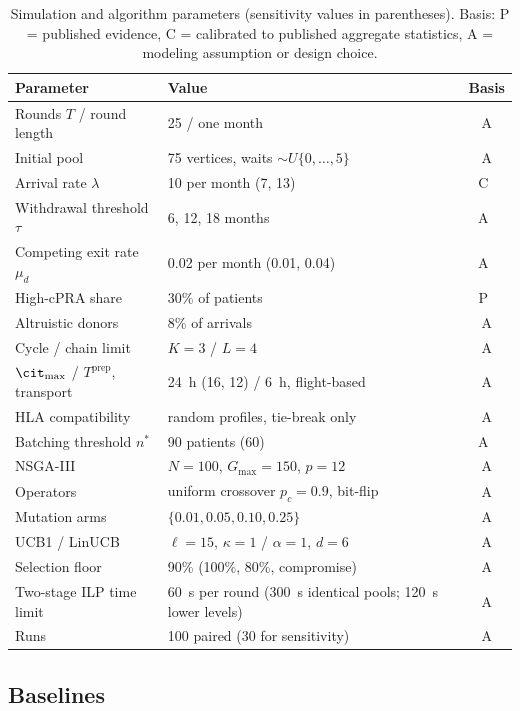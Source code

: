 \documentclass[journal]{IEEEtran}
\begin{document}
\begin{table}[!htbp]
\caption{Simulation and algorithm parameters (sensitivity values in
parentheses). Basis: P = published evidence, C = calibrated to
published aggregate statistics, A = modeling assumption or design
choice.}
\label{tab:params}
\begin{tabular}{llc}
\toprule
Parameter & Value & Basis \\
\midrule
Rounds $T$ / round length & 25 / one month & A \\
Initial pool & 75 vertices, waits $\sim U\{0,\dots,5\}$ & A \\
Arrival rate $\lambda$ & 10 per month (7, 13) & C~\cite{ANZKX2021,DonateLife2024} \\
Withdrawal threshold $\tau$ & 6, 12, 18 months & A~\cite{Ferrari2012} \\
Competing exit rate $\mu_d$ & 0.02 per month (0.01, 0.04) & A~\cite{DonateLife2024} \\
High-cPRA share & 30\% of patients & P~\cite{ANZDATA2026} \\
Altruistic donors & 8\% of arrivals & A \\
Cycle / chain limit & $K = 3$ / $L = 4$ & A \\
$\cit_{\max}$ / $T^{\mathrm{prep}}$, transport & 24~h (16, 12) / 6~h, flight-based & A \\
HLA compatibility & random profiles, tie-break only & A \\
Batching threshold $n^*$ & 90 patients (60) & A~\cite{ANZKX2021} \\
NSGA-III & $N = 100$, $G_{\max} = 150$, $p = 12$ & A \\
Operators & uniform crossover $p_c = 0.9$, bit-flip & A \\
Mutation arms & $\{0.01, 0.05, 0.10, 0.25\}$ & A \\
UCB1 / LinUCB & $\ell = 15$, $\kappa = 1$ / $\alpha = 1$, $d = 6$ & A \\
Selection floor & 90\% (100\%, 80\%, compromise) & A \\
Two-stage ILP time limit & 60~s per round (300~s identical pools; 120~s lower levels) & A \\
Runs & 100 paired (30 for sensitivity) & A \\
\bottomrule
\end{tabular}
\end{table}

\subsection{Baselines}
\label{sec:exp:baselines}
\end{document}
